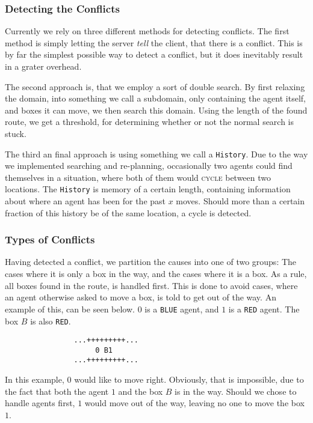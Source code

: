 \documentclass[letterpaper]{article}
\begin{document}
		\subsubsection{Detecting the Conflicts}
			Currently we rely on three different methods for detecting conflicts. The first method is simply letting the server \emph{tell} the client, that there is a conflict. This is by far the simplest possible way to detect a conflict, but it does inevitably result in a grater overhead. 

			The second approach is, that we employ a sort of double search. By first relaxing the domain, into something we call a subdomain, only containing the agent itself, and boxes it can move, we then search this domain. Using the length of the found route, we get a threshold, for determining whether or not the normal search is stuck.



			The third an final approach is using something we call a \verb=History=. Due to the way we implemented searching and re-planning, occasionally two agents could find themselves in a situation, where both of them would \textsc{cycle} between two locations. The \verb=History= is memory of a certain length, containing information about where an agent has been for the past $x$ moves. Should more than a certain fraction of this history be of the same location, a cycle is detected.

		\subsubsection{Types of Conflicts}
			Having detected a conflict, we partition the causes into one of two groups: The cases where it is only a box in the way, and the cases where it is a box. As a rule, all boxes found in the route, is handled first. This is done to avoid cases, where an agent otherwise asked to move a box, is told to get out of the way. An example of this, can be seen below. $0$ is a \verb=BLUE= agent, and $1$ is a \verb=RED= agent. The box $B$ is also \verb=RED=. 
			\begin{verbatim}
				...+++++++++...
				     0 B1
				...+++++++++...
			\end{verbatim}
			In this example, $0$ would like to move right. Obviously, that is impossible, due to the fact that both the agent $1$ and the box $B$ is in the way. Should we chose to handle agents first, $1$ would move out of the way, leaving no one to move the box $1$.
\end{document}
